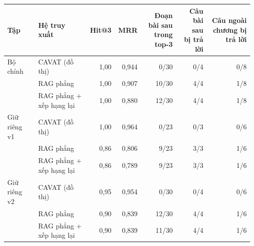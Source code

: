 \small
\begin{tabular}{@{}llrrrrr@{}}
\toprule
Tập & Hệ truy xuất & Hit@3 & MRR & \makecell{Đoạn bài sau\\trong top-3} & \makecell{Câu bài sau\\bị trả lời} & \makecell{Câu ngoài\\chương bị trả lời} \\
\midrule
Bộ chỉnh & CAVAT (đồ thị) & 1,00 & 0,944 & 0/30 & 0/4 & 0/8 \\
 & RAG phẳng & 1,00 & 0,907 & 10/30 & 4/4 & 1/8 \\
 & RAG phẳng + xếp hạng lại & 1,00 & 0,880 & 12/30 & 4/4 & 1/8 \\
\midrule
Giữ riêng v1 & CAVAT (đồ thị) & 1,00 & 0,964 & 0/23 & 0/3 & 0/6 \\
 & RAG phẳng & 0,86 & 0,806 & 9/23 & 3/3 & 1/6 \\
 & RAG phẳng + xếp hạng lại & 0,86 & 0,789 & 9/23 & 3/3 & 1/6 \\
\midrule
Giữ riêng v2 & CAVAT (đồ thị) & 0,95 & 0,954 & 0/30 & 0/4 & 0/6 \\
 & RAG phẳng & 0,90 & 0,839 & 12/30 & 4/4 & 1/6 \\
 & RAG phẳng + xếp hạng lại & 0,90 & 0,839 & 11/30 & 4/4 & 1/6 \\
\bottomrule
\end{tabular}

